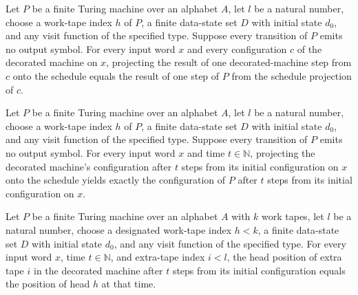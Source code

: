 \begin{lemma}
\label{Complexity.decorateTM_step}
\leanok
{}
Let $P$ be a finite Turing machine over an alphabet $A$, let $l$ be a natural number,
choose a work-tape index $h$ of $P$, a finite data-state set $D$ with initial state
$d_0$, and any visit function of the specified type. Suppose every transition of $P$
emits no output symbol. For every input word $x$ and every configuration $c$ of the
decorated machine on $x$, projecting the result of one decorated-machine step from $c$
onto the schedule equals the result of one step of $P$ from the schedule projection of
$c$.
\end{lemma}

\begin{lemma}
\label{Complexity.decorateTM_run}
\leanok
{}
Let $P$ be a finite Turing machine over an alphabet $A$, let $l$ be a natural number,
choose a work-tape index $h$ of $P$, a finite data-state set $D$ with initial state
$d_0$, and any visit function of the specified type. Suppose every transition of $P$
emits no output symbol. For every input word $x$ and time $t\in\mathbb N$, projecting
the decorated machine's configuration after $t$ steps from its initial configuration on
$x$ onto the schedule yields exactly the configuration of $P$ after $t$ steps from its
initial configuration on $x$.
\end{lemma}

\begin{lemma}
\label{Complexity.decorateTM_heads}
\leanok
{}
Let $P$ be a finite Turing machine over an alphabet $A$ with $k$ work tapes, let $l$ be
a natural number, choose a designated work-tape index $h<k$, a finite data-state set $D$
with initial state $d_0$, and any visit function of the specified type. For every input
word $x$, time $t\in\mathbb N$, and extra-tape index $i<l$, the head position of extra
tape $i$ in the decorated machine after $t$ steps from its initial configuration equals
the position of head $h$ at that time.
\end{lemma}

